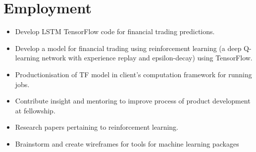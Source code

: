\documentclass[11pt,a4paper,unicode]{moderncv}
\begin{document}
\vspace*{-6mm}
\maketitle
\vspace*{-6mm}

\section{Employment}


\vspace{-.1cm}
\cvline{}
{\begin{itemize} 
	  \item Develop LSTM TensorFlow code for financial trading predictions.
	  \item Develop a model for financial trading using reinforcement learning (a deep Q-learning network with experience replay and epsilon-decay) using TensorFlow.
	  \item Productionisation of TF model in client's computation framework for running jobs.
	  \item Contribute insight and mentoring to improve process of product development at fellowship.
	  \item Research papers pertaining to reinforcement learning.
	  \item Brainstorm and create wireframes for tools for machine learning packages
\end{itemize}}
\vspace{-.5cm}
\end{document}
